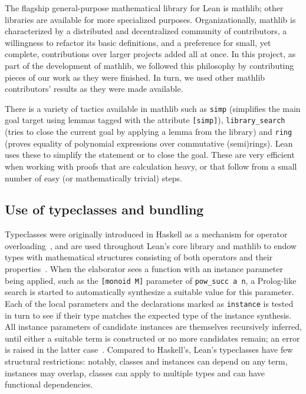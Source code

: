 \documentclass[sn-mathphys]{sn-jnl}%
\newcommand{\lean}[1]{\texttt{#1}\xspace}
\newcommand{\mathlib}{\textsf{mathlib}\xspace}
\begin{document}
The flagship general-purpose mathematical library for Lean is \mathlib; other libraries are available for more specialized purposes.
Organizationally, \mathlib is characterized by a distributed and decentralized community of contributors, a willingness to refactor its basic definitions, and a preference for small, yet complete, contributions over larger projects added all at once.
In this project, as part of the development of \mathlib, we followed this philosophy by contributing pieces of our work as they were finished.
In turn, we used other \mathlib contributors' results as they were made available.

There is a variety of tactics available in \mathlib such as
\lean{simp} (simplifies the main goal target using lemmas tagged with the attribute \lean{[simp]}),
\lean{library\_search} (tries to close the current goal by applying a lemma from the library) and
\lean{ring} (proves equality of polynomial expressions over commutative (semi)rings).
Lean uses these to simplify the statement or to close the goal.
These are very efficient when working with proofs that are calculation heavy,
or that follow from a small number of easy (or mathematically trivial) steps.

\subsection{Use of typeclasses and bundling} \label{sec:typeclasses}
Typeclasses were originally introduced in Haskell as a mechanism for operator overloading~\cite{typeclasses-haskell},
and are used throughout Lean's core library and \mathlib to endow types with mathematical structures consisting of both operators and their properties~\cite{mathlib}.
When the elaborator sees a function with an instance parameter being applied, such as the \lean{[monoid M]} parameter of \lean{pow\_succ a n}, a Prolog-like search is started to automatically synthesize a suitable value for this parameter.
Each of the local parameters and the declarations marked as \lean{instance} is tested in turn to see if their type matches the expected type of the instance synthesis.
All instance parameters of candidate instances are themselves recursively inferred, until either a suitable term is constructed or no more candidates remain; an error is raised in the latter case~\cite[Section 10]{theorem-proving-in-lean}.
Compared to Haskell's, Lean's typeclasses have few structural restrictions: notably, classes and instances can depend on any term, instances may overlap, classes can apply to multiple types and can have functional dependencies.
\end{document}

